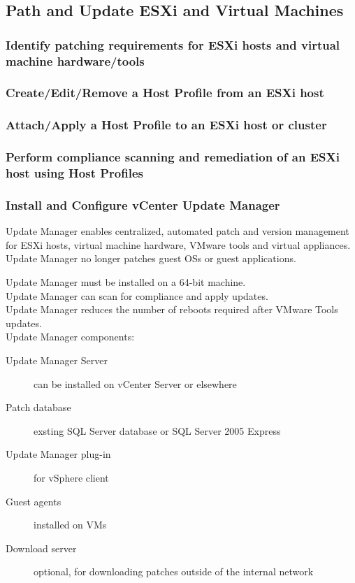 \subsection{Path and Update ESXi and Virtual Machines}

\subsubsection{Identify patching requirements for ESXi hosts and virtual machine hardware/tools}

\subsubsection{Create/Edit/Remove a Host Profile from an ESXi host}

\subsubsection{Attach/Apply a Host Profile to an ESXi host or cluster}

\subsubsection{Perform compliance scanning and remediation of an ESXi host using Host Profiles}

\subsubsection{Install and Configure vCenter Update Manager}

Update Manager enables centralized, automated patch and version management
for ESXi hosts, virtual machine hardware, VMware tools and virtual
appliances. Update Manager no longer patches guest OSs or guest applications.

Update Manager must be installed on a 64-bit machine.\\

Update Manager can scan for compliance and apply updates.\\

Update Manager reduces the number of reboots required after VMware Tools
updates.\\

Update Manager components:

\begin{description}

\item[Update Manager Server]
can be installed on vCenter Server or elsewhere

\item[Patch database]
exsting SQL Server database or SQL Server 2005 Express

\item[Update Manager plug-in]
for vSphere client

\item[Guest agents]
installed on VMs

\item[Download server]
optional, for downloading patches outside of the internal network

\end{description}

